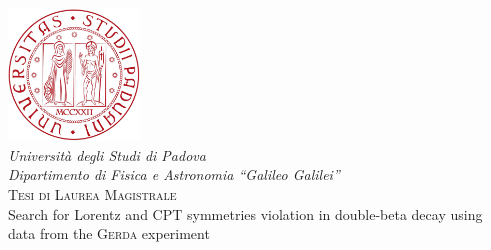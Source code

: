 \documentclass[12pt, a4paper]{book}
\newcommand{\aof}{\mathring{a}_\text{of}^{(3)}}
\begin{document}
\begin{titlepage}
	\thispagestyle{empty}
	\begin{center}
	\includegraphics[width=3.5cm]{img/logo.pdf} \\
	\vspace{1cm}
	\textsl{Universit\`a degli Studi di Padova} \\
	\textsl{Dipartimento di Fisica e Astronomia ``Galileo Galilei''} \\
	\vspace{11pt}
	\textsc{Tesi di Laurea Magistrale} \\
	\vspace{3cm}
	\LARGE{Search for Lorentz and CPT symmetries violation in double-beta decay using data from the \textsc{Gerda} experiment}
	\end{center}

\end{titlepage}
\end{document}
